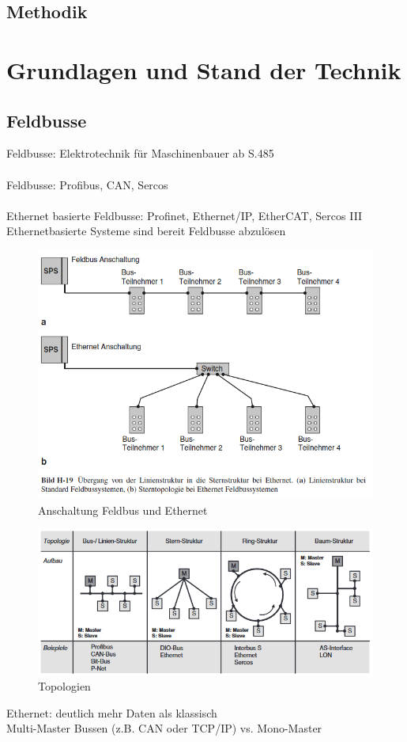 \documentclass[ a4paper,
                oneside,
                toc=bibliography,
                toc=listof
                ]{scrbook}
\begin{document}
	\section{Methodik}

	\chapter{Grundlagen und Stand der Technik}
	
	\section{Feldbusse}
	Feldbusse: Elektrotechnik für Maschinenbauer ab S.485\\
	\\
	Feldbusse: Profibus, CAN, Sercos
	\\
	\\	
	Ethernet basierte Feldbusse: Profinet, Ethernet/IP, EtherCAT, Sercos III \\
	Ethernetbasierte Systeme sind bereit Feldbusse abzulösen \\
	\begin{figure}[!ht]
		\centering
		\includegraphics[width=1.0\linewidth]{./images/Feldbus vs Ethernet Anschaltung.png}
		\caption{Anschaltung Feldbus und Ethernet \cite{hering2012elektrotechnik}}
		\label{fig:Anschaltung Bus}
	\end{figure}
	\begin{figure}[!ht]
		\centering
		\includegraphics[width=1.0\linewidth]{./images/Topologien.png}
		\caption{Topologien}
		\label{fig:Topologien}
	\end{figure}
	Ethernet: deutlich mehr Daten als klassisch \\
	Multi-Master Bussen (z.B. CAN oder TCP/IP) vs. Mono-Master
	
\end{document}
